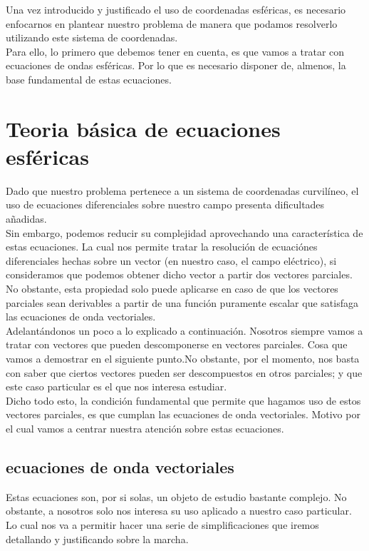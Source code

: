 \documentclass{article}
\begin{document}
Una vez introducido y justificado el uso de coordenadas esféricas, es necesario enfocarnos en plantear nuestro problema de manera que podamos resolverlo utilizando este sistema de coordenadas. \\
Para ello, lo primero que debemos tener en cuenta, es que vamos a tratar con ecuaciones de ondas esféricas. Por lo que es necesario disponer de, almenos, la base fundamental de estas ecuaciones.

\section{Teoria básica de ecuaciones esféricas}

Dado que nuestro problema pertenece a un sistema de coordenadas curvilíneo,  el uso de ecuaciones diferenciales sobre nuestro campo presenta dificultades añadidas. \\
Sin embargo, podemos reducir su complejidad aprovechando una característica de estas ecuaciones. La cual nos permite tratar la resolución de ecuaciónes diferenciales hechas sobre un vector (en nuestro caso, el campo eléctrico), si consideramos que podemos obtener dicho vector a partir dos vectores parciales.\\
No obstante, esta propiedad  solo puede aplicarse en caso de que los vectores parciales sean derivables a partir de una función puramente escalar que satisfaga las ecuaciones de onda vectoriales. \\

Adelantándonos un poco a lo explicado a continuación. Nosotros  siempre vamos a tratar con vectores que pueden descomponerse en vectores parciales. Cosa que vamos a demostrar en el siguiente punto.No obstante, por el momento, nos basta con saber que ciertos vectores pueden ser descompuestos en otros parciales; y que este caso particular es el que nos interesa estudiar.
\\
Dicho todo esto, la condición fundamental que permite que hagamos uso de estos vectores parciales, es que cumplan las ecuaciones de onda vectoriales. Motivo por el cual vamos a centrar nuestra atención sobre estas ecuaciones.

\subsection{ecuaciones de onda vectoriales}

Estas ecuaciones son, por si solas, un objeto de estudio bastante complejo.  No obstante, a nosotros solo nos interesa su uso aplicado a nuestro caso particular.
Lo cual nos va a permitir hacer una serie de simplificaciones que iremos detallando y justificando sobre la marcha.\\
\end{document}

